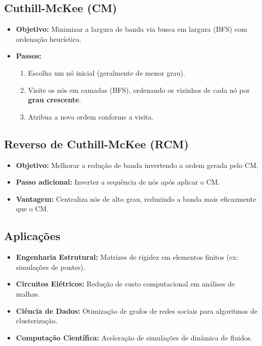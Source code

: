 \subsection*{Cuthill-McKee (CM)}
\begin{itemize}
    \item \textbf{Objetivo:} Minimizar a largura de banda via busca em largura (BFS) com ordenação heurística.
    \item \textbf{Passos:}
    \begin{enumerate}
        \item Escolha um nó inicial (geralmente de menor grau).
        \item Visite os nós em camadas (BFS), ordenando os vizinhos de cada nó por \textbf{grau crescente}.
        \item Atribua a nova ordem conforme a visita.
    \end{enumerate}
\end{itemize}

\subsection*{Reverso de Cuthill-McKee (RCM)}
\begin{itemize}
    \item \textbf{Objetivo:} Melhorar a redução de banda invertendo a ordem gerada pelo CM.
    \item \textbf{Passo adicional:} Inverter a sequência de nós após aplicar o CM.
    \item \textbf{Vantagem:} Centraliza nós de alto grau, reduzindo a banda mais eficazmente que o CM.
\end{itemize}

\subsection*{Aplicações}
\begin{itemize}
    \item \textbf{Engenharia Estrutural:} Matrizes de rigidez em elementos finitos (ex: simulações de pontes).
    \item \textbf{Circuitos Elétricos:} Redução de custo computacional em análises de malhas.
    \item \textbf{Ciência de Dados:} Otimização de grafos de redes sociais para algoritmos de clusterização.
    \item \textbf{Computação Científica:} Aceleração de simulações de dinâmica de fluidos.
\end{itemize}

